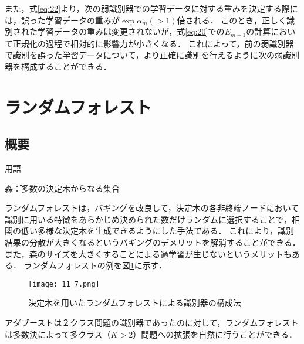 \documentclass[dvipdfmx]{jreport}
\begin{document}
また，式\eqref{eq:22}より，次の弱識別器での学習データに対する重みを決定する際には，誤った学習データの重みが$\exp{\alpha_m}( > 1)$倍される．
このとき，正しく識別された学習データの重みは変更されないが，式\eqref{eq:20}での$E_{m+1}$の計算において正規化の過程で相対的に影響力が小さくなる．
これによって，前の弱識別器で識別を誤った学習データについて，より正確に識別を行えるように次の弱識別器を構成することができる．


\section{ランダムフォレスト}
\label{ランダムフォレスト}
\subsection{概要}
\begin{itembox}[l]{\large{用語}}
    \begin{tabbing}
        \hspace{15pt} \raisebox{0.5ex}{\tiny $\bullet$} 森\hspace{3pt}\=：多数の決定木からなる集合
    \end{tabbing}
\end{itembox}

ランダムフォレストは，バギングを改良して，決定木の各非終端ノードにおいて識別に用いる特徴をあらかじめ決められた数だけランダムに選択することで，相関の低い多様な決定木を生成できるようにした手法である．
これにより，識別結果の分散が大きくなるというバギングのデメリットを解消することができる．
また，森のサイズを大きくすることによる過学習が生じないというメリットもある．
ランダムフォレストの例を図\ref{fig:7}に示す．
\begin{figure}[h]
    \begin{center}
        \texttt{[image: 11\_7.png]}
        \caption{決定木を用いたランダムフォレストによる識別器の構成法} \label{fig:7}
    \end{center}
\end{figure}

アダブーストは２クラス問題の識別器であったのに対して，ランダムフォレストは多数決によって多クラス（$K > 2$）問題への拡張を自然に行うことができる．
\end{document}
